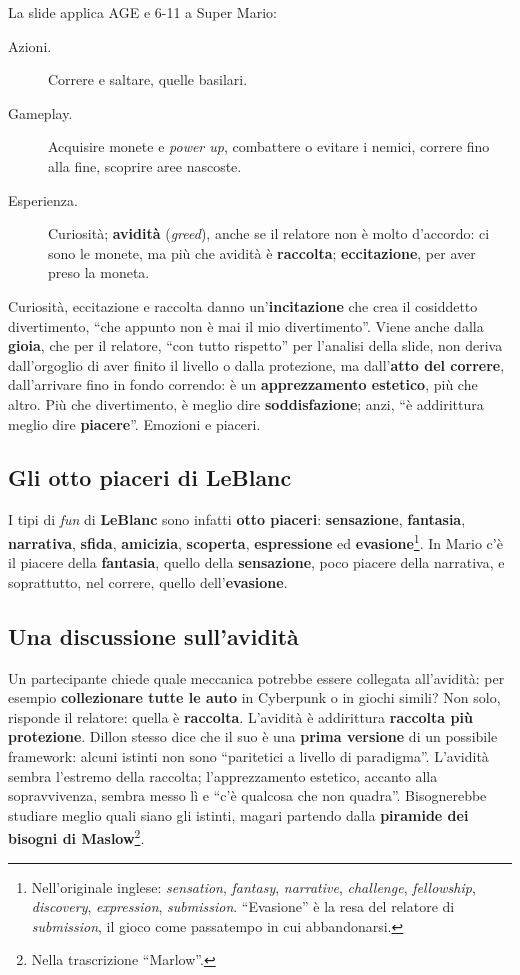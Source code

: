 La slide applica AGE e 6-11 a Super Mario:
\begin{description}
  \item[Azioni.] Correre e saltare, quelle basilari.
  \item[Gameplay.] Acquisire monete e \emph{power up}, combattere o evitare i
        nemici, correre fino alla fine, scoprire aree nascoste.
  \item[Esperienza.] Curiosità; \textbf{avidità} (\emph{greed}), anche se il
        relatore non è molto d'accordo: ci sono le monete, ma più che avidità
        è \textbf{raccolta}; \textbf{eccitazione}, per aver preso la moneta.
\end{description}
Curiosità, eccitazione e raccolta danno un'\textbf{incitazione} che crea il
cosiddetto divertimento, ``che appunto non è mai il mio divertimento''. Viene
anche dalla \textbf{gioia}, che per il relatore, ``con tutto rispetto'' per
l'analisi della slide, non deriva dall'orgoglio di aver finito il livello o dalla
protezione, ma dall'\textbf{atto del correre}, dall'arrivare fino in fondo
correndo: è un \textbf{apprezzamento estetico}, più che altro. Più che
divertimento, è meglio dire \textbf{soddisfazione}; anzi, ``è addirittura meglio
dire \textbf{piacere}''. Emozioni e piaceri.

\subsection{Gli otto piaceri di LeBlanc}

I tipi di \emph{fun} di \textbf{LeBlanc} sono infatti \textbf{otto piaceri}:
\textbf{sensazione}, \textbf{fantasia}, \textbf{narrativa}, \textbf{sfida},
\textbf{amicizia}, \textbf{scoperta}, \textbf{espressione} ed
\textbf{evasione}\footnote{Nell'originale inglese: \emph{sensation},
\emph{fantasy}, \emph{narrative}, \emph{challenge}, \emph{fellowship},
\emph{discovery}, \emph{expression}, \emph{submission}. ``Evasione'' è la resa del
relatore di \emph{submission}, il gioco come passatempo in cui abbandonarsi.}.
In Mario c'è il piacere della \textbf{fantasia}, quello della
\textbf{sensazione}, poco piacere della narrativa, e soprattutto, nel correre,
quello dell'\textbf{evasione}.

\subsection{Una discussione sull'avidità}

Un partecipante chiede quale meccanica potrebbe essere collegata
all'avidità: per esempio \textbf{collezionare tutte le auto} in Cyberpunk o in
giochi simili? Non solo, risponde il relatore: quella è \textbf{raccolta}.
L'avidità è addirittura \textbf{raccolta più protezione}. Dillon stesso dice che
il suo è una \textbf{prima versione} di un possibile framework: alcuni istinti non
sono ``paritetici a livello di paradigma''. L'avidità sembra l'estremo della
raccolta; l'apprezzamento estetico, accanto alla sopravvivenza, sembra messo lì
e ``c'è qualcosa che non quadra''. Bisognerebbe studiare meglio quali siano gli
istinti, magari partendo dalla \textbf{piramide dei bisogni di
Maslow}\footnote{Nella trascrizione ``Marlow''.}.


